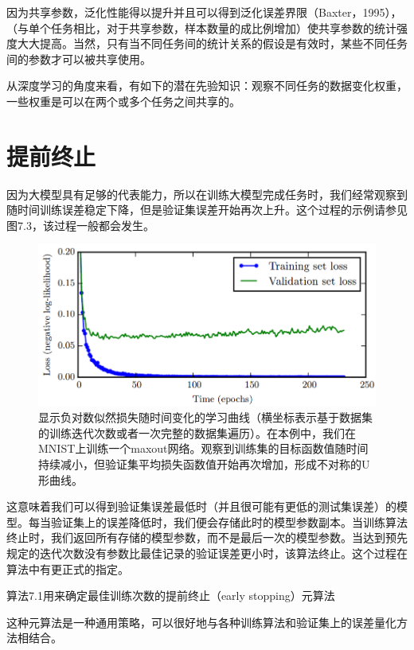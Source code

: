 因为共享参数，泛化性能得以提升并且可以得到泛化误差界限（Baxter，1995），（与单个任务相比，对于共享参数，样本数量的成比例增加）使共享参数的统计强度大大提高。当然，只有当不同任务间的统计关系的假设是有效时，某些不同任务间的参数才可以被共享使用。

从深度学习的角度来看，有如下的潜在先验知识：观察不同任务的数据变化权重，一些权重是可以在两个或多个任务之间共享的。

\section{提前终止}

因为大模型具有足够的代表能力，所以在训练大模型完成任务时，我们经常观察到随时间训练误差稳定下降，但是验证集误差开始再次上升。这个过程的示例请参见图7.3，该过程一般都会发生。

\begin{figure}[htbp] %
   \centering
   \includegraphics[width=5in]{fig/chap7/7_3.png} 
   \caption{显示负对数似然损失随时间变化的学习曲线（横坐标表示基于数据集的训练迭代次数或者一次完整的数据集遍历）。在本例中，我们在MNIST上训练一个maxout网络。观察到训练集的目标函数值随时间持续减小，但验证集平均损失函数值开始再次增加，形成不对称的U形曲线。}
   \label{fig:7_3}
\end{figure}

这意味着我们可以得到验证集误差最低时（并且很可能有更低的测试集误差）的模型。每当验证集上的误差降低时，我们便会存储此时的模型参数副本。当训练算法终止时，我们返回所有存储的模型参数，而不是最后一次的模型参数。当达到预先规定的迭代次数没有参数比最佳记录的验证误差更小时，该算法终止。这个过程在算法中有更正式的指定。

算法7.1用来确定最佳训练次数的提前终止（early stopping）元算法

这种元算法是一种通用策略，可以很好地与各种训练算法和验证集上的误差量化方法相结合。

